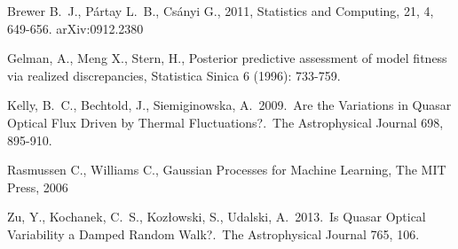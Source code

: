 \documentclass[a4paper, 10pt]{article}
\begin{document}
\begin{thebibliography}{99}

 Brewer B.~J., P{\'a}rtay L.~B.,
Cs{\'a}nyi G., 2011, Statistics and Computing, 21, 4, 649-656. arXiv:0912.2380

 Gelman, A.,
Meng X., Stern, H., Posterior predictive assessment of model fitness via realized discrepancies,
Statistica Sinica 6 (1996): 733-759.

 Kelly, B.~C., Bechtold, 
J., Siemiginowska, A.\ 2009.\ Are the Variations in Quasar Optical Flux 
Driven by Thermal Fluctuations?.\ The Astrophysical Journal 698, 895-910. 


 Rasmussen C., Williams C., Gaussian Processes for Machine Learning, The MIT Press, 2006

 Zu, Y., Kochanek, C.~S., 
Koz{\l}owski, S., Udalski, A.\ 2013.\ Is Quasar Optical Variability a 
Damped Random Walk?.\ The Astrophysical Journal 765, 106. 
\end{thebibliography}
\end{document}
